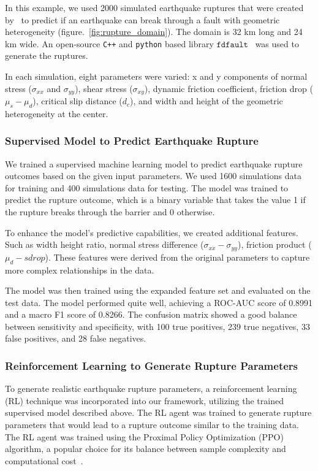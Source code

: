 \documentclass{article}
\begin{document}
In this example, we used 2000 simulated earthquake ruptures that were created by~\cite{ahamed2021application} to predict if an earthquake can break through a fault with geometric heterogeneity (figure.~\ref{fig:rupture_domain}). The domain is 32 km long and 24 km wide. An open-source \texttt{C++} and \texttt{python} based library $\texttt{fdfault}$~\cite{fdfaultEricGithub} was used to generate the ruptures.

In each simulation, eight parameters were varied: x and y components of normal stress ($\sigma_{xx}$ and $\sigma_{yy}$), shear stress ($\sigma_{xy}$), dynamic friction coefficient, friction drop ($\mu_{s} - \mu_{d}$), critical slip distance ($d_c$), and width and height of the geometric heterogeneity at the center.

\subsubsection{Supervised Model to Predict Earthquake Rupture}

We trained a supervised machine learning model to predict earthquake rupture outcomes based on the given input parameters. We used 1600 simulations data for training and 400 simulations data for testing. The model was trained to predict the rupture outcome, which is a binary variable that takes the value 1 if the rupture breaks through the barrier and 0 otherwise.

To enhance the model's predictive capabilities, we created additional features. Such as width height ratio, normal stress difference ($\sigma_{xx} - \sigma_{yy}$), friction product ($\mu_{d} - sdrop$). These features were derived from the original parameters to capture more complex relationships in the data.

The model was then trained using the expanded feature set and evaluated on the test data. The model performed quite well, achieving a ROC-AUC score of 0.8991 and a macro F1 score of 0.8266. The confusion matrix showed a good balance between sensitivity and specificity, with 100 true positives, 239 true negatives, 33 false positives, and 28 false negatives.

\subsubsection{Reinforcement Learning to Generate Rupture Parameters}

To generate realistic earthquake rupture parameters, a reinforcement learning (RL) technique was incorporated into our framework, utilizing the trained supervised model described above. The RL agent was trained to generate rupture parameters that would lead to a rupture outcome similar to the training data. The RL agent was trained using the Proximal Policy Optimization (PPO) algorithm, a popular choice for its balance between sample complexity and computational cost~\cite{schulman2017proximal}.
\end{document}
